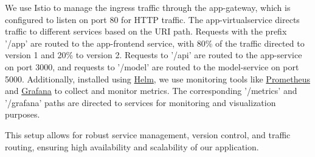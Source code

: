 We use Istio to manage the ingress traffic through the app-gateway, which is configured to listen on port 80 for HTTP traffic. The app-virtualservice directs traffic to different services based on the URI path. Requests with the prefix '/app' are routed to the app-frontend service, with 80\% of the traffic directed to version 1 and 20\% to version 2. Requests to '/api' are routed to the app-service on port 3000, and requests to '/model' are routed to the model-service on port 5000. Additionally, installed using {\color{blue} \href{https://helm.sh/}{Helm}}, we use monitoring tools like {\color{blue}\href{https://prometheus.io/docs/introduction/overview/}{Prometheus}} and {\color{blue} \href{https://duckduckgo.com/?q=grafana&ia=web}{Grafana}} to collect and monitor metrics. The corresponding '/metrics' and '/grafana' paths are directed to   services for monitoring and visualization purposes. 

This setup allows for robust service management, version control, and traffic routing, ensuring high availability and scalability of our application.


